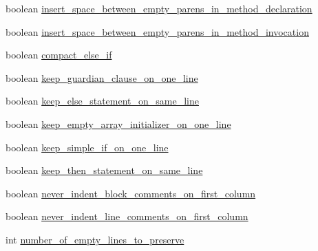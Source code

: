 \begin{DoxyCompactItemize}
\item 
boolean \hyperlink{classorg_1_1eclipse_1_1jdt_1_1ui_1_1tests_1_1refactoring_1_1infra_1_1TestFormatterOptions_a9c682511c0dc83ae37d5dc676dc30d6d}{insert\_\-space\_\-between\_\-empty\_\-parens\_\-in\_\-method\_\-declaration}
\item 
boolean \hyperlink{classorg_1_1eclipse_1_1jdt_1_1ui_1_1tests_1_1refactoring_1_1infra_1_1TestFormatterOptions_a72c675f1929cc601383d3bce37311678}{insert\_\-space\_\-between\_\-empty\_\-parens\_\-in\_\-method\_\-invocation}
\item 
boolean \hyperlink{classorg_1_1eclipse_1_1jdt_1_1ui_1_1tests_1_1refactoring_1_1infra_1_1TestFormatterOptions_a18df725d30b838eb919dd69adf29195e}{compact\_\-else\_\-if}
\item 
boolean \hyperlink{classorg_1_1eclipse_1_1jdt_1_1ui_1_1tests_1_1refactoring_1_1infra_1_1TestFormatterOptions_a2f5b55926adff5d389b29a68c4be3934}{keep\_\-guardian\_\-clause\_\-on\_\-one\_\-line}
\item 
boolean \hyperlink{classorg_1_1eclipse_1_1jdt_1_1ui_1_1tests_1_1refactoring_1_1infra_1_1TestFormatterOptions_a7a76df13193fa213c3386bd04cd049b0}{keep\_\-else\_\-statement\_\-on\_\-same\_\-line}
\item 
boolean \hyperlink{classorg_1_1eclipse_1_1jdt_1_1ui_1_1tests_1_1refactoring_1_1infra_1_1TestFormatterOptions_adaf9ce033c4a5e6f89d972f21f5357e2}{keep\_\-empty\_\-array\_\-initializer\_\-on\_\-one\_\-line}
\item 
boolean \hyperlink{classorg_1_1eclipse_1_1jdt_1_1ui_1_1tests_1_1refactoring_1_1infra_1_1TestFormatterOptions_a6d5e811d1475070205a1b68ec156213f}{keep\_\-simple\_\-if\_\-on\_\-one\_\-line}
\item 
boolean \hyperlink{classorg_1_1eclipse_1_1jdt_1_1ui_1_1tests_1_1refactoring_1_1infra_1_1TestFormatterOptions_a123a66c9316e38dc56c864065be8e127}{keep\_\-then\_\-statement\_\-on\_\-same\_\-line}
\item 
boolean \hyperlink{classorg_1_1eclipse_1_1jdt_1_1ui_1_1tests_1_1refactoring_1_1infra_1_1TestFormatterOptions_a02a406fe48e65b47f825b7b4f3153b75}{never\_\-indent\_\-block\_\-comments\_\-on\_\-first\_\-column}
\item 
boolean \hyperlink{classorg_1_1eclipse_1_1jdt_1_1ui_1_1tests_1_1refactoring_1_1infra_1_1TestFormatterOptions_ac880ac3eff097813209472b3bd21d7f3}{never\_\-indent\_\-line\_\-comments\_\-on\_\-first\_\-column}
\item 
int \hyperlink{classorg_1_1eclipse_1_1jdt_1_1ui_1_1tests_1_1refactoring_1_1infra_1_1TestFormatterOptions_a33ee8b6ec61829b8d9fb02aeb15c1d48}{number\_\-of\_\-empty\_\-lines\_\-to\_\-preserve}

\end{DoxyCompactItemize}
